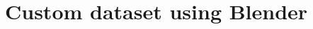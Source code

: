\documentclass[../thesis.tex]{subfiles}
\begin{document}
\section{Custom dataset using Blender}

	
\end{document}

